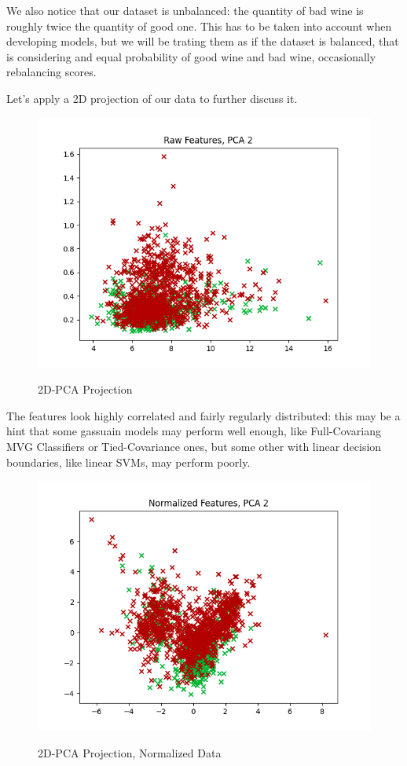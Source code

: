 \documentclass[twocolumn]{article}
\begin{document}
We also notice that our dataset is unbalanced: the quantity of bad wine is roughly twice the quantity of good one. This has to be taken into account when developing models, but we will be trating them as if the dataset is balanced, that is considering and equal probability of good wine and bad wine, occasionally rebalancing scores.

Let's apply a 2D projection of our data to further discuss it.

\begin{figure}[H]
    \caption{2D-PCA Projection}
    {\includegraphics[width=\linewidth]{2DRAW.png}}
    \label{2DRAW}
\end{figure}

The features look highly correlated and fairly regularly distributed: this may be a hint that some gassuain models may perform well enough, like Full-Covariang MVG Classifiers or Tied-Covariance ones, but some other with linear decision boundaries, like linear SVMs, may perform poorly.

\begin{figure}[H]
    \caption{2D-PCA Projection, Normalized Data}
    {\includegraphics[width=\linewidth]{2DNorm.png}}
    \label{2DNORM}
\end{figure}
\end{document}
